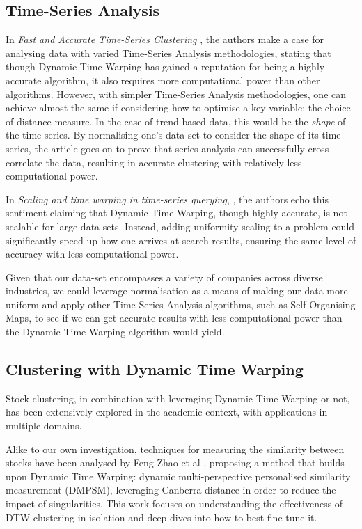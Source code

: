 \documentclass[11pt]{article}
\begin{document}
\subsection{Time-Series Analysis}

In \textit{Fast and Accurate Time-Series Clustering} \cite{fastAccurateTimeSeriesClustering}, the authors make a case for analysing data with varied Time-Series Analysis methodologies, stating that though Dynamic Time Warping has gained a reputation for being a highly accurate algorithm, it also requires more computational power than other algorithms. However, with simpler Time-Series Analysis methodologies, one can achieve almost the same if considering how to optimise a key variable: the choice of distance measure. In the case of trend-based data, this would be the \textit{shape} of the time-series. By normalising one's data-set to consider the shape of its time-series, the article goes on to prove that series analysis can successfully cross-correlate the data, resulting in accurate clustering with relatively less computational power. 

In \textit{Scaling and time warping in time-series querying}, \cite{ref3}, the authors echo this sentiment claiming that Dynamic Time Warping, though highly accurate, is not scalable for large data-sets. Instead, adding uniformity scaling to a problem could significantly speed up how one arrives at search results, ensuring the same level of accuracy with less computational power. 

Given that our data-set encompasses a variety of companies across diverse industries, we could leverage normalisation as a means of making our data more uniform and apply other Time-Series Analysis algorithms, such as Self-Organising Maps, to see if we can get accurate results with less computational power than the Dynamic Time Warping algorithm would yield.

\subsection{Clustering with Dynamic Time Warping}

Stock clustering, in combination with leveraging Dynamic Time Warping or not, has been extensively explored in the academic context, with applications in multiple domains. 

Alike to our own investigation, techniques for measuring the similarity between stocks have been analysed by Feng Zhao et al \cite{ref4}, proposing a method that builds upon Dynamic Time Warping: dynamic multi-perspective personalised similarity measurement (DMPSM), leveraging Canberra distance in order to reduce the impact of singularities. This work focuses on understanding the effectiveness of DTW clustering in isolation and deep-dives into how to best fine-tune it.
\end{document}

